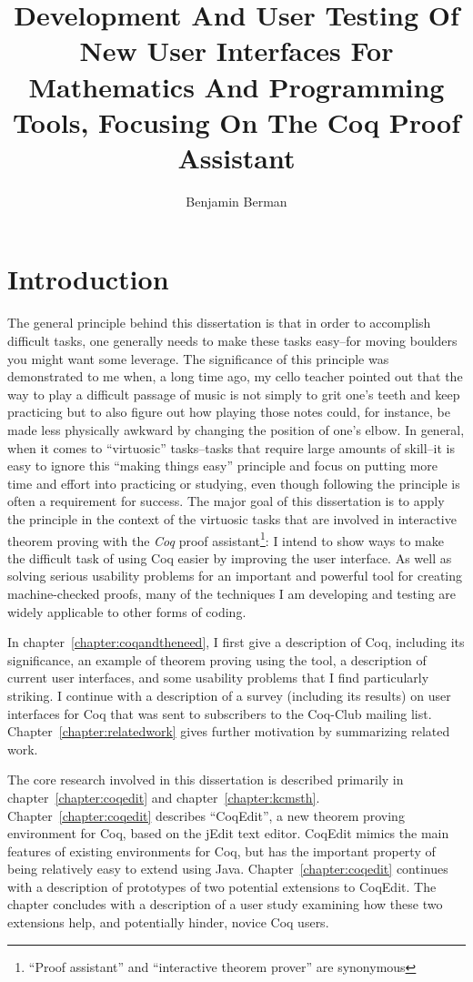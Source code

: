 \documentclass[phd,appendix]{uithesis}
\title{Development And User Testing Of New User Interfaces For Mathematics And Programming Tools, Focusing On The Coq Proof Assistant}
\author{Benjamin Berman}
\begin{document}
\frontmatter

\chapter{Introduction}

The general principle behind this dissertation is that in order to accomplish difficult tasks, one generally needs to make these tasks easy--for moving boulders you might want some leverage.  The significance of this principle was demonstrated to me when, a long time ago, my cello teacher pointed out that the way to play a difficult passage of music is not simply to grit one's teeth and keep practicing but to also figure out how playing those notes could, for instance, be made less physically awkward by changing the position of one's elbow.  In general, when it comes to ``virtuosic'' tasks--tasks that require large amounts of skill--it is easy to ignore this ``making things easy'' principle and focus on putting more time and effort into practicing or studying, even though following the principle is often a requirement for success.  The major goal of this dissertation is to apply the principle in the context of the virtuosic tasks that are involved in interactive theorem proving with the \textit{Coq} proof assistant\cite{Coq}\footnote{``Proof assistant'' and ``interactive theorem prover'' are synonymous}:  I intend to show ways to make the difficult task of using Coq easier by improving the user interface.  As well as solving serious usability problems for an important and powerful tool for creating machine-checked proofs, many of the techniques I am developing and testing are widely applicable to other forms of coding.

In chapter~\ref{chapter:coqandtheneed}, I first give a description of Coq, including its significance, an example of theorem proving using the tool, a description of current user interfaces,  and some usability problems that I find particularly striking.  I continue with a description of a survey (including its results) on user interfaces for Coq that was sent to subscribers to the Coq-Club mailing list. Chapter~\ref{chapter:relatedwork} gives further motivation by summarizing related work.

The core research involved in this dissertation is described primarily in chapter~\ref{chapter:coqedit} and chapter~\ref{chapter:kcmsth}.  Chapter~\ref{chapter:coqedit} describes ``CoqEdit'', a new theorem proving environment for Coq, based on the jEdit text editor.  CoqEdit mimics the main features of existing environments for Coq, but has the important property of being relatively easy to extend using Java.  Chapter~\ref{chapter:coqedit} continues with a description of prototypes of two potential extensions to CoqEdit.  The chapter concludes with a description of a user study examining how these two extensions help, and potentially hinder, novice Coq users.
\end{document}
